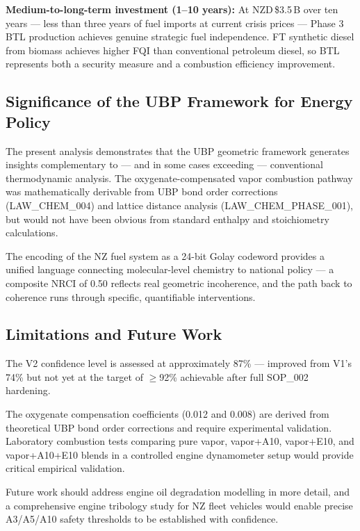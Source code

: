 \documentclass[12pt,a4paper]{article}
\begin{document}
\textbf{Medium-to-long-term investment (1--10 years):} At NZD\,\$3.5\,B over ten
years --- less than three years of fuel imports at current crisis prices --- Phase 3
BTL production achieves genuine strategic fuel independence. FT synthetic diesel from
biomass achieves higher FQI than conventional petroleum diesel, so BTL represents
both a security measure and a combustion efficiency improvement.

\subsection{Significance of the UBP Framework for Energy Policy}

The present analysis demonstrates that the UBP geometric framework generates insights
complementary to --- and in some cases exceeding --- conventional thermodynamic analysis.
The oxygenate-compensated vapor combustion pathway was mathematically derivable from
UBP bond order corrections (LAW\_CHEM\_004) and lattice distance analysis
(LAW\_CHEM\_PHASE\_001), but would not have been obvious from standard enthalpy and
stoichiometry calculations.

The encoding of the NZ fuel system as a 24-bit Golay codeword provides a unified
language connecting molecular-level chemistry to national policy --- a composite NRCI
of 0.50 reflects real geometric incoherence, and the path back to coherence runs
through specific, quantifiable interventions.

\subsection{Limitations and Future Work}

The V2 confidence level is assessed at approximately 87\% --- improved from V1's 74\%
but not yet at the target of $\geq$92\% achievable after full SOP\_002 hardening.

The oxygenate compensation coefficients (0.012 and 0.008) are derived from theoretical
UBP bond order corrections and require experimental validation. Laboratory combustion
tests comparing pure vapor, vapor+A10, vapor+E10, and vapor+A10+E10 blends in a
controlled engine dynamometer setup would provide critical empirical validation.

Future work should address engine oil degradation modelling in more detail, and a
comprehensive engine tribology study for NZ fleet vehicles would enable precise
A3/A5/A10 safety thresholds to be established with confidence.
\end{document}
